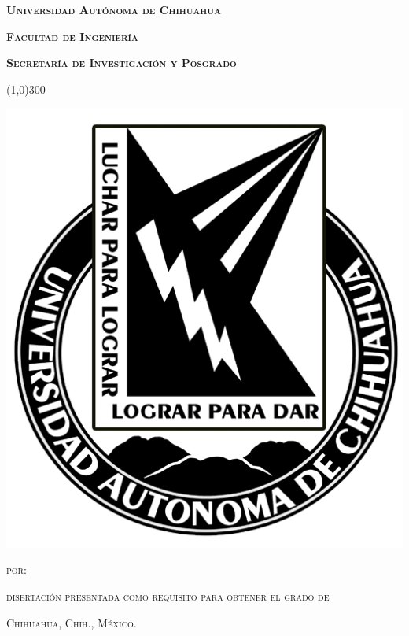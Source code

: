 
\thispagestyle{empty}

\begin{center}

    \LARGE{ \textbf{ \textsc{
        Universidad Autónoma de Chihuahua
    } } }    
    
    \vspace*{3mm}
    \Large{ \textbf{ \textsc{
        Facultad de Ingeniería
    } } }    
    
    \vspace*{4mm}
    \large{ \textbf{ \textsc{
        Secretaría de Investigación y Posgrado
    } } }  
    
    \vspace*{5mm}
    \line(1,0){300}
    
    \vspace*{1.5cm}
    \includegraphics[keepaspectratio=true,]{template/uach.png}
    
    \vspace*{1cm}
    \huge{ \textbf{ \textsc{
        \vTitulo
    } } }    
    
    \vspace*{1cm}
    \normalsize{ 
        \textsc{
            por:
        } 
    }  
    
    \vspace*{5mm}
    \LARGE{ \textbf{ \textsc{
        \vAutor
    } } }   
    
    \vspace*{7mm}
    \normalsize{
        \textsc{
            disertación presentada como requisito para obtener el grado de 
        } 
    }
    
    \vspace*{5mm}
    \Large{ \textbf{ \textsc{
        \vGrado
    } } }   
    
\end{center}

\vspace*{5cm}
\normalsize{ 
    \textsc{
        Chihuahua, Chih., México.
        \hspace*{9cm}
        \vFecha
    }
}

\restoregeometry    

